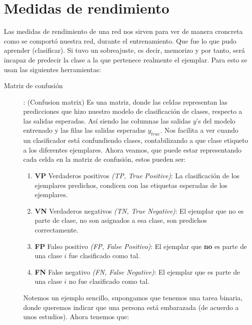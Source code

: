 \section{Medidas de rendimiento}

Las medidas de rendimiento de una red nos sirven para ver de manera croncreta como se comportó nuestra red, durante el entrenamiento. Que fue lo que pudo aprender (clasificar). Si tuvo un sobreajuste, es decir, memorizo y por tanto, será incapaz de predecir la clase a la que pertenece realmente el ejemplar. Para esto se usan las siguientes herramientas:

\begin{description}
 \item [Matriz de confusión]: (Confusion matrix)
 Es una matriz, donde las celdas representan las predicciones que hizo nuestro modelo de clasificación de clases, respecto a las salidas esperadas. Así siendo las columnas las salidas $y$'s del modelo entrenado y las filas las salidas esperadas $y_{true}$. 
 Nos facilita a ver cuando un clasificador está confundiendo clases, contabilizando a que clase etiqueto a los diferentes ejemplares. Ahora veamos, que puede estar representando cada celda en la matriz de confusión, estos pueden ser:
 \begin{enumerate}
  \item \textbf{VP} Verdaderos positivos \emph{(TP, True Positive)}: La clasificación de los ejemplares predichos, condicen con las etiquetas esperadas de los ejemplares. 
  
  \item \textbf{VN} Verdaderos negativos \emph{(TN, True Negative)}: El ejemplar que no es parte de clase, no son asignados a esa clase, son predichos correctamente.
  
  \item \textbf{FP} Falso positivo \emph{(FP, False Positivo)}: El ejemplar que \textbf{no} es parte de una clase $i$ fue clasificado como tal.
  
  \item \textbf{FN} False negativo  \emph{(FN, False Negative)}: El ejemplar que es parte de una clase $i$ no fue clasificado como tal. 
 \end{enumerate}

  \begin{example}
   Notemos un ejemplo sencillo, supongamos que tenemos una tarea binaria, donde queremos indicar que una persona está
   embarazada (de acuerdo a unos estudios). Ahora tenemos que:
   


\end{example}
\end{description}
